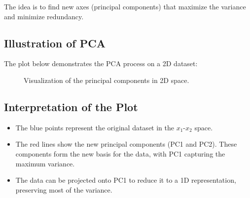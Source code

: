 \documentclass{article}
\begin{document}
The idea is to find new axes (principal components) that maximize the variance and minimize redundancy.

\subsection*{Illustration of PCA}
The plot below demonstrates the PCA process on a 2D dataset:



\begin{figure}[ht]
    \centering
    \caption{Visualization of the principal components in 2D space.}
    \label{fig:pca}
\end{figure}

\subsection*{Interpretation of the Plot}

\begin{itemize}
    \item The blue points represent the original dataset in the \(x_1\)-\(x_2\) space.
    \item The red lines show the new principal components (PC1 and PC2). These components form the new basis for the data, with PC1 capturing the maximum variance.
    \item The data can be projected onto PC1 to reduce it to a 1D representation, preserving most of the variance.
\end{itemize}
\end{document}
